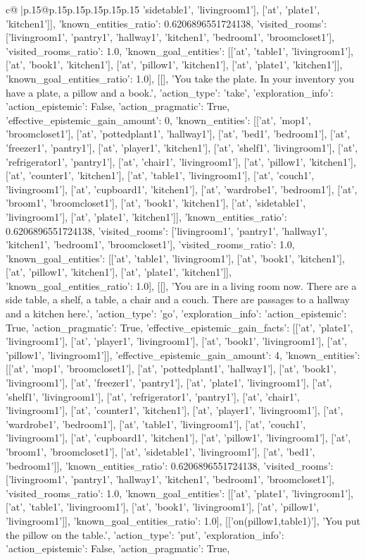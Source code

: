 \documentclass{article}
\begin{document}
{\begin{supertabular}{c@{$\;$}|p{.15\linewidth}@{}p{.15\linewidth}p{.15\linewidth}p{.15\linewidth}p{.15\linewidth}p{.15\linewidth}}
{{{'sidetable1', 'livingroom1'], ['at', 'plate1', 'kitchen1']], 'known_entities_ratio': 0.6206896551724138, 'visited_rooms': ['livingroom1', 'pantry1', 'hallway1', 'kitchen1', 'bedroom1', 'broomcloset1'], 'visited_rooms_ratio': 1.0, 'known_goal_entities': [['at', 'table1', 'livingroom1'], ['at', 'book1', 'kitchen1'], ['at', 'pillow1', 'kitchen1'], ['at', 'plate1', 'kitchen1']], 'known_goal_entities_ratio': 1.0}}], [[], 'You take the plate. In your inventory you have a plate, a pillow and a book.', {'action_type': 'take', 'exploration_info': {'action_epistemic': False, 'action_pragmatic': True, 'effective_epistemic_gain_amount': 0, 'known_entities': [['at', 'mop1', 'broomcloset1'], ['at', 'pottedplant1', 'hallway1'], ['at', 'bed1', 'bedroom1'], ['at', 'freezer1', 'pantry1'], ['at', 'player1', 'kitchen1'], ['at', 'shelf1', 'livingroom1'], ['at', 'refrigerator1', 'pantry1'], ['at', 'chair1', 'livingroom1'], ['at', 'pillow1', 'kitchen1'], ['at', 'counter1', 'kitchen1'], ['at', 'table1', 'livingroom1'], ['at', 'couch1', 'livingroom1'], ['at', 'cupboard1', 'kitchen1'], ['at', 'wardrobe1', 'bedroom1'], ['at', 'broom1', 'broomcloset1'], ['at', 'book1', 'kitchen1'], ['at', 'sidetable1', 'livingroom1'], ['at', 'plate1', 'kitchen1']], 'known_entities_ratio': 0.6206896551724138, 'visited_rooms': ['livingroom1', 'pantry1', 'hallway1', 'kitchen1', 'bedroom1', 'broomcloset1'], 'visited_rooms_ratio': 1.0, 'known_goal_entities': [['at', 'table1', 'livingroom1'], ['at', 'book1', 'kitchen1'], ['at', 'pillow1', 'kitchen1'], ['at', 'plate1', 'kitchen1']], 'known_goal_entities_ratio': 1.0}}], [[], 'You are in a living room now. There are a side table, a shelf, a table, a chair and a couch. There are passages to a hallway and a kitchen here.', {'action_type': 'go', 'exploration_info': {'action_epistemic': True, 'action_pragmatic': True, 'effective_epistemic_gain_facts': [['at', 'plate1', 'livingroom1'], ['at', 'player1', 'livingroom1'], ['at', 'book1', 'livingroom1'], ['at', 'pillow1', 'livingroom1']], 'effective_epistemic_gain_amount': 4, 'known_entities': [['at', 'mop1', 'broomcloset1'], ['at', 'pottedplant1', 'hallway1'], ['at', 'book1', 'livingroom1'], ['at', 'freezer1', 'pantry1'], ['at', 'plate1', 'livingroom1'], ['at', 'shelf1', 'livingroom1'], ['at', 'refrigerator1', 'pantry1'], ['at', 'chair1', 'livingroom1'], ['at', 'counter1', 'kitchen1'], ['at', 'player1', 'livingroom1'], ['at', 'wardrobe1', 'bedroom1'], ['at', 'table1', 'livingroom1'], ['at', 'couch1', 'livingroom1'], ['at', 'cupboard1', 'kitchen1'], ['at', 'pillow1', 'livingroom1'], ['at', 'broom1', 'broomcloset1'], ['at', 'sidetable1', 'livingroom1'], ['at', 'bed1', 'bedroom1']], 'known_entities_ratio': 0.6206896551724138, 'visited_rooms': ['livingroom1', 'pantry1', 'hallway1', 'kitchen1', 'bedroom1', 'broomcloset1'], 'visited_rooms_ratio': 1.0, 'known_goal_entities': [['at', 'plate1', 'livingroom1'], ['at', 'table1', 'livingroom1'], ['at', 'book1', 'livingroom1'], ['at', 'pillow1', 'livingroom1']], 'known_goal_entities_ratio': 1.0}}], [['on(pillow1,table1)'], 'You put the pillow on the table.', {'action_type': 'put', 'exploration_info': {'action_epistemic': False, 'action_pragmatic': True, }}}
\end{supertabular}}
\end{document}
